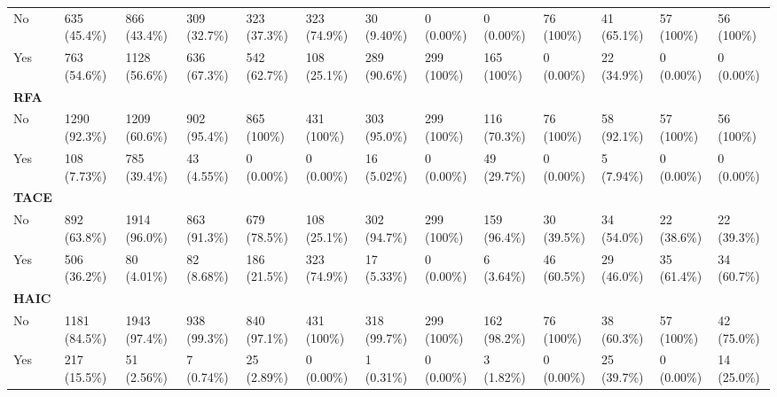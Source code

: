 \documentclass{article}
\begin{document}
\begin{landscape}
\begin{tiny}
\begin{tabularx}{\linewidth}{p{2.0cm}|X|X|X|X|X|X|X|X|X|X|X|X}
\rowcolor{gray!10}
    No &   635 (45.4\%)    &   866 (43.4\%)    &   309 (32.7\%)    &   323 (37.3\%)    &   323 (74.9\%)    &    30 (9.40\%)    &    0 (0.00\%)     &    0 (0.00\%)     &    76 (100\%)     &    41 (65.1\%)    &    57 (100\%)     &    56 (100\%)     \\
\rowcolor{gray!10}
    Yes &   763 (54.6\%)    &   1128 (56.6\%)   &   636 (67.3\%)    &   542 (62.7\%)    &   108 (25.1\%)    &   289 (90.6\%)    &    299 (100\%)    &    165 (100\%)    &    0 (0.00\%)     &    22 (34.9\%)    &    0 (0.00\%)     &    0 (0.00\%)     \\
\rowcolor{gray!30}
\textbf{RFA }  &  &  &  &  &  &  &  &  &  &  &  &  \\
\rowcolor{gray!10}
    No &   1290 (92.3\%)   &   1209 (60.6\%)   &   902 (95.4\%)    &    865 (100\%)    &    431 (100\%)    &   303 (95.0\%)    &    299 (100\%)    &   116 (70.3\%)    &    76 (100\%)     &    58 (92.1\%)    &    57 (100\%)     &    56 (100\%)     \\
\rowcolor{gray!10}
    Yes &   108 (7.73\%)    &   785 (39.4\%)    &    43 (4.55\%)    &    0 (0.00\%)     &    0 (0.00\%)     &    16 (5.02\%)    &    0 (0.00\%)     &    49 (29.7\%)    &    0 (0.00\%)     &    5 (7.94\%)     &    0 (0.00\%)     &    0 (0.00\%)     \\
\rowcolor{gray!30}
\textbf{TACE }  &  &  &  &  &  &  &  &  &  &  &  &  \\
\rowcolor{gray!10}
    No &   892 (63.8\%)    &   1914 (96.0\%)   &   863 (91.3\%)    &   679 (78.5\%)    &   108 (25.1\%)    &   302 (94.7\%)    &    299 (100\%)    &   159 (96.4\%)    &    30 (39.5\%)    &    34 (54.0\%)    &    22 (38.6\%)    &    22 (39.3\%)    \\
\rowcolor{gray!10}
    Yes &   506 (36.2\%)    &    80 (4.01\%)    &    82 (8.68\%)    &   186 (21.5\%)    &   323 (74.9\%)    &    17 (5.33\%)    &    0 (0.00\%)     &    6 (3.64\%)     &    46 (60.5\%)    &    29 (46.0\%)    &    35 (61.4\%)    &    34 (60.7\%)    \\
\rowcolor{gray!30}
\textbf{HAIC }  &  &  &  &  &  &  &  &  &  &  &  &  \\
\rowcolor{gray!10}
    No &   1181 (84.5\%)   &   1943 (97.4\%)   &   938 (99.3\%)    &   840 (97.1\%)    &    431 (100\%)    &   318 (99.7\%)    &    299 (100\%)    &   162 (98.2\%)    &    76 (100\%)     &    38 (60.3\%)    &    57 (100\%)     &    42 (75.0\%)    \\
\rowcolor{gray!10}
    Yes &   217 (15.5\%)    &    51 (2.56\%)    &    7 (0.74\%)     &    25 (2.89\%)    &    0 (0.00\%)     &    1 (0.31\%)     &    0 (0.00\%)     &    3 (1.82\%)     &    0 (0.00\%)     &    25 (39.7\%)    &    0 (0.00\%)     &    14 (25.0\%)    \\

\end{tabularx}
\end{tiny}
\end{landscape}
\end{document}
